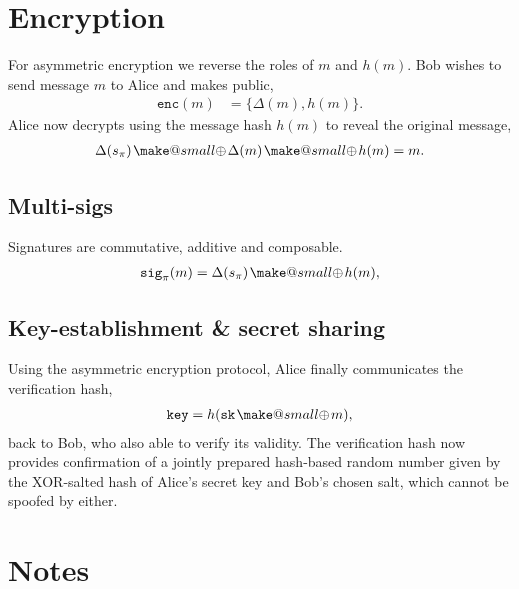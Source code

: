 \documentclass[twocolumn, aps, amsmath, amssymb, nofootinbib, superscriptaddress, longbibliography, doublefloatfix, table-of-contents, eqsecnum, rmp]{revtex4-2}
\makeatletter
\newcommand{\soplus}{{{\hspace{1pt}}{\mathbin{\mathpalette\make@small{\mathbin\oplus}}}}{\hspace{1pt}}}
\newcommand{\make@small}[2]{%
  \vcenter{\hbox{%
    \scalebox{0.6}{$\m@th#1#2$}%
  }}%
}
\makeatother
\begin{document}

\section{Encryption}

For asymmetric encryption we reverse the roles of $m$ and $h(m)$. Bob wishes to send message $m$ to Alice and makes public,
\begin{align}
	\mathtt{enc}(m) &= \{\Delta(m), h(m)\}. 
\end{align}
Alice now decrypts using the message hash $h(m)$ to reveal the original message,
\begin{align}
	\Delta(s_\pi) \soplus \Delta(m) \soplus h(m) = m.
\end{align}

\subsection{Multi-sigs}

Signatures are commutative, additive and composable.
\begin{align}
	\mathtt{sig}_\pi(m) = \Delta(s_\pi) \soplus h(m),
\end{align}

\subsection{Key-establishment \& secret sharing}

Using the asymmetric encryption protocol, Alice finally communicates the verification hash,
\begin{align}
	\mathtt{key} = h(\mathtt{sk}\soplus m),
\end{align}
back to Bob, who also able to verify its validity. The verification hash now provides confirmation of a jointly prepared hash-based random number given by  the XOR-salted hash of Alice's secret key and Bob's chosen salt, which cannot be spoofed by either.

\section{Notes}
\end{document}
